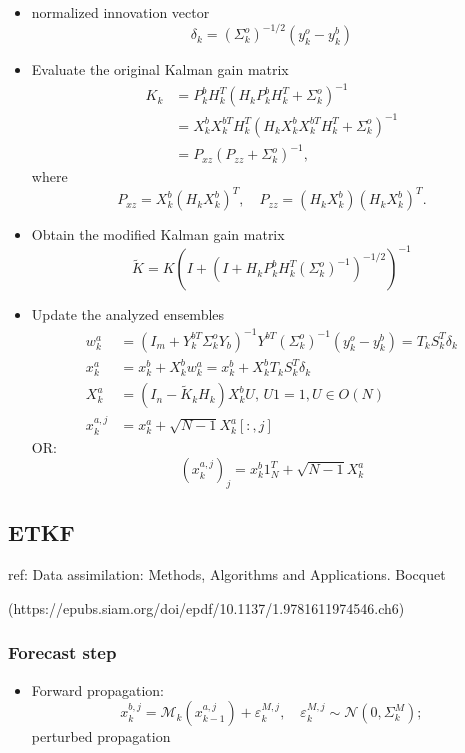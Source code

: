 \documentclass{article}
\begin{document}
\begin{itemize}
	\item normalized innovation vector
	      $$
		      \delta_k = (\Sigma_k^o)^{-1/2}(y_k^o-y_k^b)
	      $$
	\item Evaluate the original Kalman gain matrix
	      \begin{align*}
		      K_k & = P_k^bH_k^T(H_kP_k^bH_k^T+\Sigma_k^o)^{-1}                 \\
		          & = X_k^bX_k^{bT}H_k^T(H_kX_k^bX_k^{bT}H_k^T+\Sigma_k^o)^{-1} \\
		          & = P_{xz}(P_{zz}+\Sigma_k^o)^{-1},
	      \end{align*}
	      where
	      $$
		      P_{xz} = X_k^b(H_kX_k^b)^T,\quad P_{zz} = (H_kX_k^b)(H_kX_k^b)^T.
	      $$
	\item Obtain the modified Kalman gain matrix
	      $$
		      \tilde K = K(I + (I + H_kP_k^bH_k^T(\Sigma_k^o)^{-1})^{-1/2})^{-1}
	      $$
	\item Update the analyzed ensembles
	      \begin{align*}
		      w_k^a     & = (I_m + Y_k^{bT}\Sigma_k^o Y_b)^{-1}Y^{bT}(\Sigma_k^o)^{-1}(y_k^o-y_k^b)=T_kS_k^T\delta_k \\
		      x_k^a     & = x_k^b + X_k^bw_k^a = x_k^b + X_k^bT_kS_k^T\delta_k                                       \\
		      X_k^a     & = (I_n - \tilde{K}_kH_k)X_k^bU,\, U1=1, U\in O(N)                                          \\
		      x_k^{a,j} & = x_k^a + \sqrt{N-1}X_k^a[:, j]
	      \end{align*}
	      OR:
	      $$
		      (x_k^{a,j})_j = x_k^b1_N^T + \sqrt{N-1}X_k^a
	      $$
\end{itemize}

\subsection{ETKF}
ref:
Data assimilation: Methods, Algorithms and Applications. Bocquet

(https://epubs.siam.org/doi/epdf/10.1137/1.9781611974546.ch6)

\subsubsection{Forecast step}
\begin{itemize}
	\item Forward propagation:
	      $$
		      x_k^{b,j}=\mathcal{M}_k(x_{k-1}^{a,j})+\varepsilon_k^{M,j},\quad \varepsilon_k^{M,j}\sim\mathcal{N}(0,\Sigma_k^M);
	      $$
	      perturbed propagation
\end{itemize}
\end{document}
